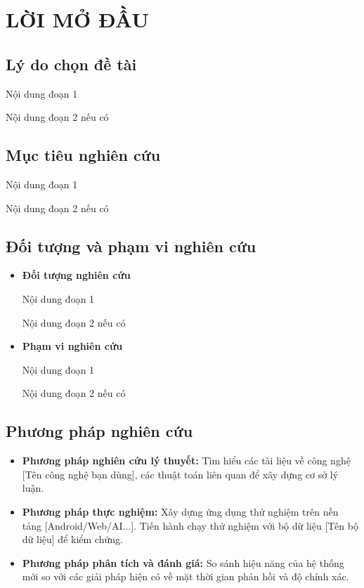 \chapter*{LỜI MỞ ĐẦU}\label{loimodau_intro}
\vspace{-40pt}

\renewcommand{\thesection}{\arabic{section}} %
\section{Lý do chọn đề tài}
Nội dung đoạn 1

Nội dung đoạn 2 nếu có
\section{Mục tiêu nghiên cứu}
Nội dung đoạn 1


Nội dung đoạn 2 nếu có
\section{Đối tượng và phạm vi nghiên cứu}
\begin{itemize}
    \item \textbf{Đối tượng nghiên cứu}
    
    Nội dung đoạn 1


    Nội dung đoạn 2 nếu có
    \item \textbf{Phạm vi nghiên cứu}
    
    Nội dung đoạn 1


    Nội dung đoạn 2 nếu có
\end{itemize}


\section{Phương pháp nghiên cứu}
\begin{itemize}
    \item \textbf{Phương pháp nghiên cứu lý thuyết:} Tìm hiểu các tài liệu về công nghệ [Tên công nghệ bạn dùng], các thuật toán liên quan để xây dựng cơ sở lý luận.
    \item \textbf{Phương pháp thực nghiệm:} Xây dựng ứng dụng thử nghiệm trên nền tảng [Android/Web/AI...]. Tiến hành chạy thử nghiệm với bộ dữ liệu [Tên bộ dữ liệu] để kiểm chứng.
    \item \textbf{Phương pháp phân tích và đánh giá:} So sánh hiệu năng của hệ thống mới so với các giải pháp hiện có về mặt thời gian phản hồi và độ chính xác.
\end{itemize}


